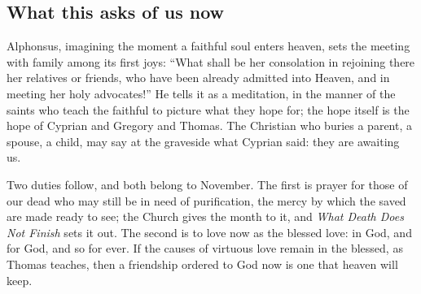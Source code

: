 \subsection{What this asks of us now}

Alphonsus, imagining the moment a faithful soul enters heaven, sets the meeting with family among its first joys: ``What shall be her consolation in rejoining there her relatives or friends, who have been already admitted into Heaven, and in meeting her holy advocates!'' He tells it as a meditation, in the manner of the saints who teach the faithful to picture what they hope for; the hope itself is the hope of Cyprian and Gregory and Thomas. The Christian who buries a parent, a spouse, a child, may say at the graveside what Cyprian said: they are awaiting us.

Two duties follow, and both belong to November. The first is prayer for those of our dead who may still be in need of purification, the mercy by which the saved are made ready to see; the Church gives the month to it, and \emph{What Death Does Not Finish} sets it out. The second is to love now as the blessed love: in God, and for God, and so for ever. If the causes of virtuous love remain in the blessed, as Thomas teaches, then a friendship ordered to God now is one that heaven will keep.

